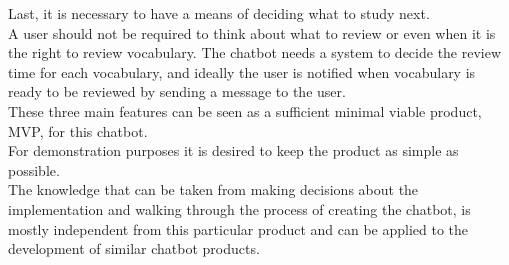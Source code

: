Last, it is necessary to have a means of deciding what to study next.
\\
A user should not be required to think about what to review or even when it is the right to review vocabulary.
The chatbot needs a system to decide the review time for each vocabulary,
and ideally the user is notified when vocabulary is ready to be reviewed by sending a message to the user.
\\


These three main features can be seen as a sufficient minimal viable product, MVP, for this chatbot.
\\
For demonstration purposes it is desired to keep the product as simple as possible.
\\
The knowledge that can be taken from making decisions about the implementation and walking through the process of creating the chatbot,
is mostly independent from this particular product and can be applied to the development of similar chatbot products.
